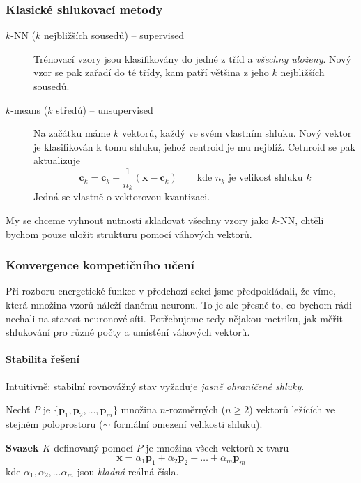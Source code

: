 \documentclass[11pt]{report} %
\renewcommand{\vec}[1]{\mathbf{#1}}
\numberwithin{equation}{section}
\begin{document}
\subsubsection{Klasické shlukovací metody}
\begin{description}
	\item[$k$-NN ($k$ nejbližších sousedů) -- supervised] Trénovací vzory jsou klasifikovány do jedné z tříd a \textit{všechny uloženy}. Nový vzor se pak zařadí do té třídy, kam patří většina z jeho $k$ nejbližších sousedů.
	
	\item[$k$-means ($k$ středů) -- unsupervised] Na začátku máme $k$ vektorů, každý ve svém vlastním shluku. Nový vektor je klasifikován k tomu shluku, jehož centroid je mu nejblíž. Cetnroid se pak aktualizuje
	$$\vec{c}_k = \vec{c}_k + \frac{1}{n_k}(\vec{x} - \vec{c}_k)\qquad \text{kde $n_k$ je velikost shluku $k$}$$
	Jedná se vlastně o vektorovou kvantizaci.
\end{description}

My se chceme vyhnout nutnosti skladovat všechny vzory jako $k$-NN, chtěli bychom pouze uložit strukturu pomocí váhových vektorů.


\subsubsection{Konvergence kompetičního učení}
Při rozboru energetické funkce v předchozí sekci jsme předpokládali, že víme, která množina vzorů náleží danému neuronu. To je ale přesně to, co bychom rádi nechali na starost neuronové síti. Potřebujeme tedy nějakou metriku, jak měřit  shlukování pro různé počty a umístění váhových vektorů.

\paragraph{Stabilita řešení}
Intuitivně: stabilní rovnovážný stav vyžaduje \textit{jasně ohraničené shluky}.

Nechť $P$ je $\{\vec{p}_1, \vec{p}_2, \dots, \vec{p}_m\}$ množina $n$-rozměrných ($n \geq 2$) vektorů ležících ve stejném poloprostoru ($\sim$ formální omezení velikosti shluku). 

\textbf{Svazek $K$} definovaný pomocí $P$ je množina všech vektorů $\vec{x}$ tvaru 
$$\vec{x} = \alpha_1\vec{p}_1 + \alpha_2\vec{p}_2 + \dots + \alpha_m\vec{p}_m$$
kde $\alpha_1, \alpha_2,\dots \alpha_m$ jsou \textit{kladná} reálná čísla.
\end{document}
